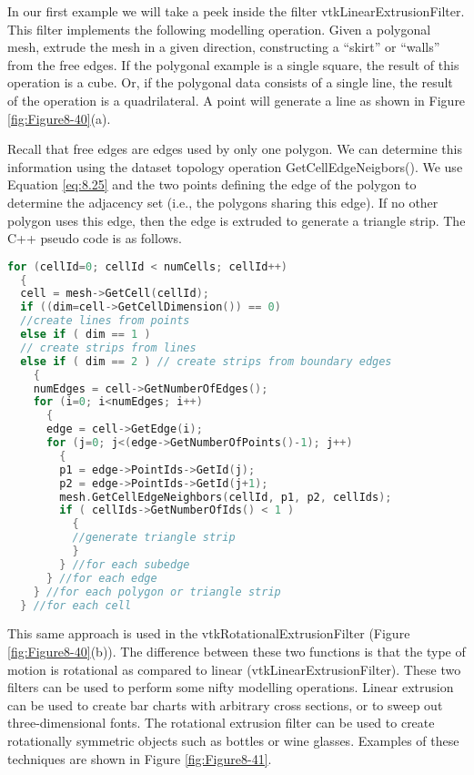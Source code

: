 In our first example we will take a peek inside the filter vtkLinearExtrusionFilter. This filter implements the following modelling operation. Given a polygonal mesh, extrude the mesh in a given direction, constructing a ``skirt'' or ``walls'' from the free edges. If the polygonal example is a single square, the result of this operation is a cube. Or, if the polygonal data consists of a single line, the result of the operation is a quadrilateral. A point will generate a line as shown in Figure \ref{fig:Figure8-40}(a).

Recall that free edges are edges used by only one polygon. We can determine this information using the dataset topology operation GetCellEdgeNeigbors(). We use Equation \ref{eq:8.25} and the two points defining the edge of the polygon to determine the adjacency set (i.e., the polygons sharing this edge). If no other polygon uses this edge, then the edge is extruded to generate a triangle strip. The C++ pseudo code is as follows.

\begin{lstlisting}[language=C++, caption={Determining free edges.}]
for (cellId=0; cellId < numCells; cellId++)
  {
  cell = mesh->GetCell(cellId);
  if ((dim=cell->GetCellDimension()) == 0)
  //create lines from points
  else if ( dim == 1 )
  // create strips from lines
  else if ( dim == 2 ) // create strips from boundary edges
    {
    numEdges = cell->GetNumberOfEdges();
    for (i=0; i<numEdges; i++)
      {
      edge = cell->GetEdge(i);
      for (j=0; j<(edge->GetNumberOfPoints()-1); j++)
        {
        p1 = edge->PointIds->GetId(j);
        p2 = edge->PointIds->GetId(j+1);
        mesh.GetCellEdgeNeighbors(cellId, p1, p2, cellIds);
        if ( cellIds->GetNumberOfIds() < 1 )
          {
          //generate triangle strip
          }
        } //for each subedge
      } //for each edge
    } //for each polygon or triangle strip
  } //for each cell
\end{lstlisting}

This same approach is used in the vtkRotationalExtrusionFilter (Figure \ref{fig:Figure8-40}(b)). The difference between these two functions is that the type of motion is rotational as compared to linear (vtkLinearExtrusionFilter). These two filters can be used to perform some nifty modelling operations. Linear extrusion can be used to create bar charts with arbitrary cross sections, or to sweep out three-dimensional fonts. The rotational extrusion filter can be used to create rotationally symmetric objects such as bottles or wine glasses. Examples of these techniques are shown in Figure \ref{fig:Figure8-41}.

